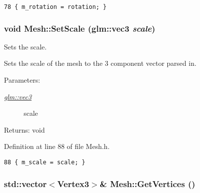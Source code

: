 \begin{Code}\begin{verbatim}78 { m_rotation = rotation; }
\end{verbatim}
\end{Code}


\hypertarget{class_mesh_d40c958d695b3aba9855581ed56a8118}{
\subsubsection[SetScale]{\setlength{\rightskip}{0pt plus 5cm}void Mesh::SetScale ({\bf glm::vec3} {\em scale})}}
\label{class_mesh_d40c958d695b3aba9855581ed56a8118}


Sets the scale. 

Sets the scale of the mesh to the 3 component vector parsed in.

\begin{Desc}
\item[Parameters:]
\begin{description}
\item[{\em \hyperlink{group__core__types_g1c47e8b3386109bc992b6c48e91b0be7}{glm::vec3}}]scale \end{description}
\end{Desc}
\begin{Desc}
\item[Returns:]void \end{Desc}


Definition at line 88 of file Mesh.h.

\begin{Code}\begin{verbatim}88 { m_scale = scale; }
\end{verbatim}
\end{Code}


\hypertarget{class_mesh_e6c2ecc1d274027b40cb75dad610eb93}{
\subsubsection[GetVertices]{\setlength{\rightskip}{0pt plus 5cm}std::vector$<$Vertex3$>$\& Mesh::GetVertices ()}}
\label{class_mesh_e6c2ecc1d274027b40cb75dad610eb93}


